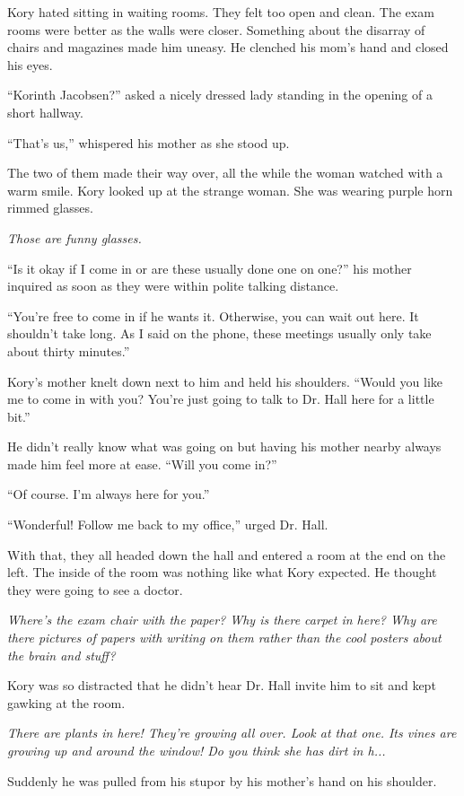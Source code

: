 Kory hated sitting in waiting rooms. They felt too open and clean. The exam rooms were better as the walls were closer. Something about the disarray of chairs and magazines made him uneasy. He clenched his mom's hand and closed his eyes.

``Korinth Jacobsen?'' asked a nicely dressed lady standing in the opening of a short hallway.

``That's us,'' whispered his mother as she stood up.

The two of them made their way over, all the while the woman watched with a warm smile. Kory looked up at the strange woman. She was wearing purple horn rimmed glasses.

\textit{Those are funny glasses.}

``Is it okay if I come in or are these usually done one on one?'' his mother inquired as soon as they were within polite talking distance.

``You're free to come in if he wants it. Otherwise, you can wait out here. It shouldn't take long. As I said on the phone, these meetings usually only take about thirty minutes.''

Kory's mother knelt down next to him and held his shoulders. ``Would you like me to come in with you? You're just going to talk to Dr. Hall here for a little bit.''

He didn't really know what was going on but having his mother nearby always made him feel more at ease. ``Will you come in?''

``Of course. I'm always here for you.''

``Wonderful! Follow me back to my office,'' urged Dr. Hall.

With that, they all headed down the hall and entered a room at the end on the left. The inside of the room was nothing like what Kory expected. He thought they were going to see a doctor.

\textit{Where's the exam chair with the paper? Why is there carpet in here? Why are there pictures of papers with writing on them rather than the cool posters about the brain and stuff?}

Kory was so distracted that he didn't hear Dr. Hall invite him to sit and kept gawking at the room.

\textit{There are plants in here! They're growing all over. Look at that one. Its vines are growing up and around the window! Do you think she has dirt in h...}

Suddenly he was pulled from his stupor by his mother's hand on his shoulder.

